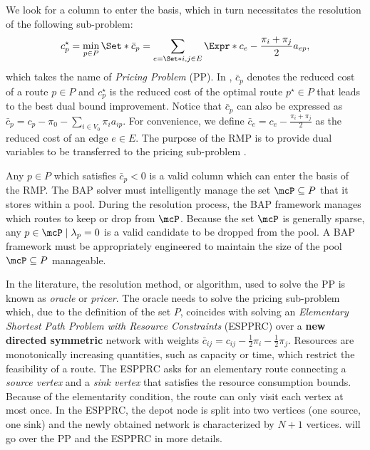We look for a column to enter the basis,
which in turn necessitates the resolution of the following sub-problem:
\begin{equation}\label{eq:pp-problem}
	{c^\star_p} = \min_{p \in P} \Set*{ \bar{c}_p = \sum_{e = \Set*{i, j} \in E} \Expr*{c_{e} - \frac{\pi_i + \pi_j}{2}} a_{ep}  },
\end{equation}
which takes the name of \textit{Pricing Problem} (PP).
In , $\bar{c}_p$ denotes the reduced cost of a route $p \in P$
and $c^\star_p$ is the reduced cost of the optimal route $p^\star \in P$
that leads to the best dual bound improvement.
Notice that $\bar{c}_p$ can also be expressed as $\bar{c}_p = c_p - \pi_0 - \sum_{i \in V_0} \pi_i a_{ip}$.
For convenience,
we define $\bar{c}_{e} = c_{e} - \frac{\pi_i + \pi_j}{2}$
as the reduced cost of an edge $e\in E$.
The purpose of the RMP is to provide dual variables
to be transferred to the pricing sub-problem \parencite{lubbecke2005}.

Any $p \in P$ which satisfies $\bar{c}_p < 0$ is a valid column which can enter the basis of the RMP.
The BAP solver must intelligently manage the set $\mcP \subseteq P$ that it stores within a pool.
During the resolution process, the BAP framework manages which routes to keep or drop from $\mcP$.
Because the set $\mcP$ is generally sparse,
any $p \in \mcP \mid \lambda_p = 0$ is a valid candidate to be dropped from the pool.
A BAP framework must be appropriately engineered to maintain
the size of the pool $\mcP \subseteq P$ manageable.

\medskip

In the literature, the resolution method, or algorithm,
used to solve the PP is known as \textit{oracle} or \textit{pricer}.
The oracle needs to solve the pricing sub-problem which, due to the definition of the set $P$,
coincides with solving an \textit{Elementary Shortest Path Problem with Resource Constraints} (ESPPRC)
over a \textbf{new directed symmetric} network with weights
$\bar{c}_{ij} = c_{ij} - \frac{1}{2} \pi_i - \frac{1}{2} \pi_j$.
Resources are monotonically increasing quantities,
such as capacity or time,
which restrict the feasibility of a route.
The ESPPRC asks for an elementary route
connecting a \textit{source vertex} and a \textit{sink vertex}
that satisfies the resource consumption bounds.
Because of the elementarity condition, the route can only visit each vertex at most once.
In the ESPPRC, the depot node is split into two vertices (one source, one sink)
and the newly obtained network is characterized by $N + 1$ vertices.
 will go over the PP and the ESPPRC in more details.

